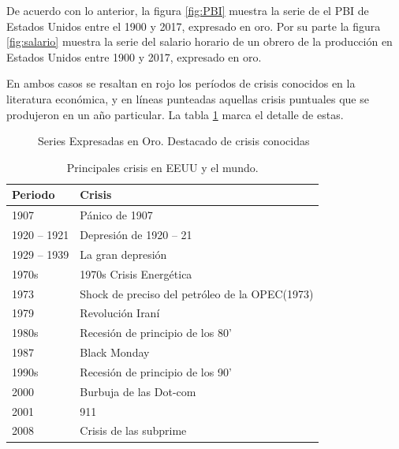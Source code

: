 \documentclass[a4paper]{article}
\begin{document}
De acuerdo con lo anterior, la figura \ref{fig:PBI} muestra la serie de el PBI de Estados Unidos entre el 1900 y 2017, expresado en oro. Por su parte la figura \ref{fig:salario} muestra la serie del salario horario de un obrero de la producción en Estados Unidos entre 1900 y 2017, expresado en oro.

 En ambos casos se resaltan en rojo los períodos de crisis conocidos en la literatura económica, y en líneas punteadas aquellas crisis puntuales que se produjeron en un año particular. La tabla \ref{tabla_crisis} marca el detalle de estas.

\begin{figure}[H]
	\centering
	\caption{Series Expresadas en Oro. Destacado de crisis conocidas} \label{fig:series_crisis}
\end{figure}

\begin{table}[ht]
	\centering
	\begin{tabular}{ll}
		\hline
		Periodo & Crisis \\ 
		\hline
		1907 & Pánico de 1907 \\ 
		1920 – 1921 & Depresión de 1920 – 21 \\ 
		1929 – 1939 & La gran depresión \\ 
		1970s & 1970s Crisis Energética \\ 
		1973 & Shock de preciso del petróleo de la OPEC(1973) \\ 
		1979 & Revolución Iraní\\ 
		1980s & Recesión de principio de los 80'\\ 
		1987 & Black Monday \\ 
		1990s & Recesión de principio de los 90'\\ 
		2000 & Burbuja de las Dot-com \\ 
		2001 & 911 \\ 
		2008 & Crisis de las subprime \\ 
		\hline
	\end{tabular}
\caption{Principales crisis en EEUU y el mundo.}
\label{tabla_crisis}
\end{table}
\end{document}
